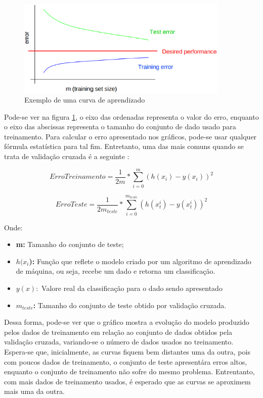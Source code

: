 \begin{figure}[h]
  \centering
  \includegraphics[width=0.9\textwidth]{figuras/curva_aprendizado.eps}
  \caption{Exemplo de uma curva de aprendizado \cite{1_ng} }
  \label{fig:curva_aprendizado}
\end{figure}

Pode-se ver na figura \ref{fig:curva_aprendizado}, o eixo das ordenadas representa
o valor do erro, enquanto o eixo das abscissas representa o tamanho do conjunto de
dado usado para treinamento. Para calcular o erro apresentado nos gráficos, pode-se
usar qualquer fórmula estatística para tal fim. Entretanto, uma das mais comuns
quando se trata de validação cruzada é a seguinte \cite{1_ng}:

\begin{equation}
ErroTreinamento = \frac{1}{2m}*\sum_{i=0}^{m}(h(x_{i}) - y(x_{i}))^2
\end{equation}

\begin{equation}
ErroTeste = \frac{1}{2m_{teste}}*\sum_{i=0}^{m_{teste}}(h(x_{t}^{i}) - y(x_{t}^{i}))^2
\end{equation}

Onde:

\begin{itemize}
    \item \textbf{m: } Tamanho do conjunto de teste;
    \item \textbf{$h(x_{i}$): } Função que reflete o modelo criado por um algoritmo
    de aprendizado de máquina, ou seja, recebe um dado e retorna um classificação.
    \item \textbf{$y(x): $} Valore real da classificação para o dado sendo apresentado
    \item \textbf{$m_{teste}$: } Tamanho do conjunto de teste obtido por validação cruzada.
\end{itemize}

Dessa forma, pode-se ver que o gráfico mostra a evolução do modelo produzido pelos
dados de treinamento em relação ao conjunto de dados obtidos pela validação cruzada,
variando-se o número de dados usados no treinamento. Espera-se que, inicialmente, as
curvas fiquem bem distantes uma da outra, pois com poucos dados de treinamento, o
conjunto de teste apresentára erros altos, enquanto o conjunto de treinamento
não sofre do mesmo problema. Entrentanto, com mais dados de treinamento usados,
é esperado que as curvas se aproximem mais uma da outra.

